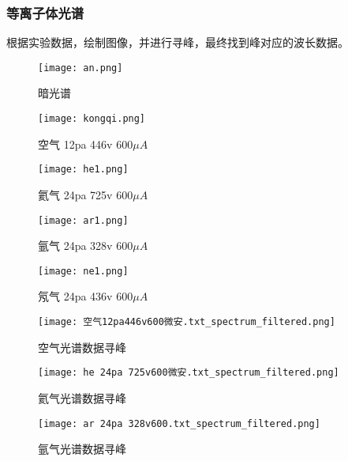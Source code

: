 \documentclass[dvipsnames, svgnames,a4paper,11pt]{article}
\begin{document}
	\subsubsection{等离子体光谱}
	根据实验数据，绘制图像，并进行寻峰，最终找到峰对应的波长数据。
	\begin{figure}[{H}]
		\centering
		\begin{minipage}{0.45\linewidth}
			\centering
			\texttt{[image: an.png]}
			\caption{暗光谱}
		\end{minipage}
		\hspace{0.05\linewidth}
		\begin{minipage}{0.45\linewidth}
			\centering
			\texttt{[image: kongqi.png]}
			\caption{空气 12pa 446v 600$\mu A$}
		\end{minipage}
	\end{figure}
	
	\begin{figure}[{H}]
		\centering
		\begin{minipage}{0.45\linewidth}
			\centering
			\texttt{[image: he1.png]}
			\caption{氦气 24pa 725v 600$\mu A$}
		\end{minipage}
		\hspace{0.05\linewidth}
		\begin{minipage}{0.45\linewidth}
			\centering
			\texttt{[image: ar1.png]}
			\caption{氩气 24pa 328v 600$\mu A$}
		\end{minipage}
	\end{figure}
	
	\begin{figure}[{H}]
		\centering
		\begin{minipage}{0.45\linewidth}
			\centering
			\texttt{[image: ne1.png]}
			\caption{氖气 24pa 436v 600$\mu A$}
		\end{minipage}
		\hspace{0.05\linewidth}
		\begin{minipage}{0.45\linewidth}
			\centering
			\texttt{[image: 空气12pa446v600微安.txt\_spectrum\_filtered.png]}
			\caption{空气光谱数据寻峰}
		\end{minipage}
	\end{figure}
	
	\begin{figure}[{H}]
		\centering
		\begin{minipage}{0.45\linewidth}
			\centering
			\texttt{[image: he 24pa 725v600微安.txt\_spectrum\_filtered.png]}
			\caption{氦气光谱数据寻峰}
		\end{minipage}
		\hspace{0.05\linewidth}
		\begin{minipage}{0.45\linewidth}
			\centering
			\texttt{[image: ar 24pa 328v600.txt\_spectrum\_filtered.png]}
			\caption{氩气光谱数据寻峰}
		\end{minipage}
	\end{figure}
	
\end{document}
